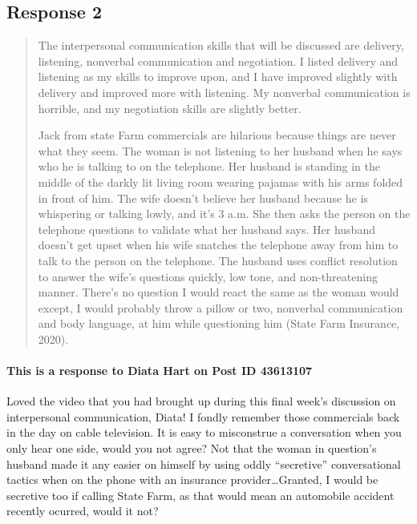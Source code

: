
\subsection{Response 2}
  \begin{quotation}
    The interpersonal communication skills that will be discussed are delivery,
      listening, nonverbal communication and negotiation. I listed delivery and
      listening as my skills to improve upon, and I have improved slightly with
      delivery and improved more with listening. My nonverbal communication is
      horrible, and my negotiation skills are slightly better.

    Jack from state Farm commercials are hilarious because things are never
      what they seem. The woman is not listening to her husband when he says
      who he is talking to on the telephone. Her husband is standing in the
      middle of the darkly lit living room wearing pajamas with his arms folded
      in front of him. The wife doesn’t believe her husband because he is
      whispering or talking lowly, and it’s 3 a.m. She then asks the person on
      the telephone questions to validate what her husband says. Her husband
      doesn't get upset when his wife snatches the telephone away from him to
      talk to the person on the telephone. The husband uses conflict resolution
      to answer the wife's questions quickly, low tone, and non-threatening
      manner. There's no question I would react the same as the woman would
      except, I would probably throw a pillow or two, nonverbal communication
      and body language, at him while questioning him
      (State Farm Insurance, 2020).
  \end{quotation}

  \paragraph{This is a response to Diata Hart on Post ID 43613107}
    Loved the video that you had brought up during this final week's discussion
      on interpersonal communication, Diata! I fondly remember those commercials
      back in the day on cable television. It is easy to misconstrue a
      conversation when you only hear one side, would you not agree? Not that
      the woman in question's husband made it any easier on himself by using
      oddly ``secretive'' conversational tactics when on the phone with
      an insurance provider\ldots Granted, I would be secretive too if calling
      State Farm, as that would mean an automobile accident recently ocurred,
      would it not?
